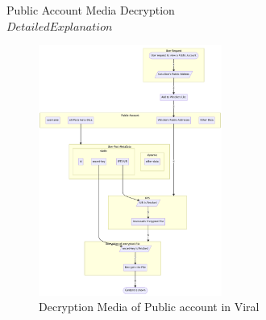 \documentclass[10pt]{article}
\begin{document}

Public Account Media Decryption\\

$Detailed Explanation$\\

\begin{figure}[H]
\begin{center}
\includegraphics[width=6cm]{decryption-public}
\caption{Decryption Media of Public account in Viral}
\end{center}
\end{figure}
\end{document}
